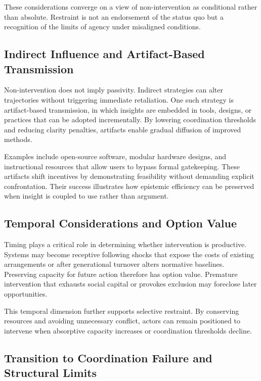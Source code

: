 \documentclass[11pt]{article}
\begin{document}
These considerations converge on a view of non-intervention as conditional rather than absolute. Restraint is not an endorsement of the status quo but a recognition of the limits of agency under misaligned conditions.

\subsection{Indirect Influence and Artifact-Based Transmission}

Non-intervention does not imply passivity. Indirect strategies can alter trajectories without triggering immediate retaliation. One such strategy is artifact-based transmission, in which insights are embedded in tools, designs, or practices that can be adopted incrementally. By lowering coordination thresholds and reducing clarity penalties, artifacts enable gradual diffusion of improved methods.

Examples include open-source software, modular hardware designs, and instructional resources that allow users to bypass formal gatekeeping. These artifacts shift incentives by demonstrating feasibility without demanding explicit confrontation. Their success illustrates how epistemic efficiency can be preserved when insight is coupled to use rather than argument.

\subsection{Temporal Considerations and Option Value}

Timing plays a critical role in determining whether intervention is productive. Systems may become receptive following shocks that expose the costs of existing arrangements or after generational turnover alters normative baselines. Preserving capacity for future action therefore has option value. Premature intervention that exhausts social capital or provokes exclusion may foreclose later opportunities.

This temporal dimension further supports selective restraint. By conserving resources and avoiding unnecessary conflict, actors can remain positioned to intervene when absorptive capacity increases or coordination thresholds decline.

\subsection{Transition to Coordination Failure and Structural Limits}
\end{document}
